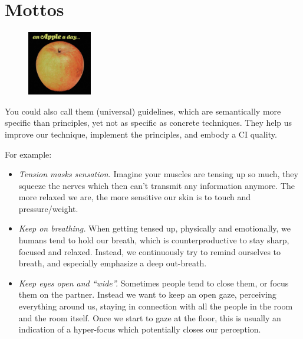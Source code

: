 \section{Mottos}\label{sec:mottos}

\begin{figure}
    \centering
    \includegraphics[width=0.25\textwidth]{images/mottos}
\end{figure}

You could also call them (universal) guidelines, which are semantically more specific than principles, yet not as specific as concrete techniques.
They help us improve our technique, implement the principles, and embody a CI quality.

For example:

\begin{itemize}
    \item \textit{Tension masks sensation.} Imagine your muscles are tensing up so much, they squeeze the nerves which then can't transmit any information anymore.
    The more relaxed we are, the more sensitive our skin is to touch and pressure/weight.
    \item \textit{Keep on breathing.} When getting tensed up, physically and emotionally, we humans tend to hold our breath, which is counterproductive to stay sharp, focused and relaxed.
    Instead, we continuously try to remind ourselves to breath, and especially emphasize a deep out-breath.
    \item \textit{Keep eyes open and ``wide''.} Sometimes people tend to close them, or focus them on the partner.
    Instead we want to keep an open gaze, perceiving everything around us, staying in connection with all the people in the room and the room itself.
    Once we start to gaze at the floor, this is usually an indication of a hyper-focus which potentially closes our perception.
\end{itemize}
